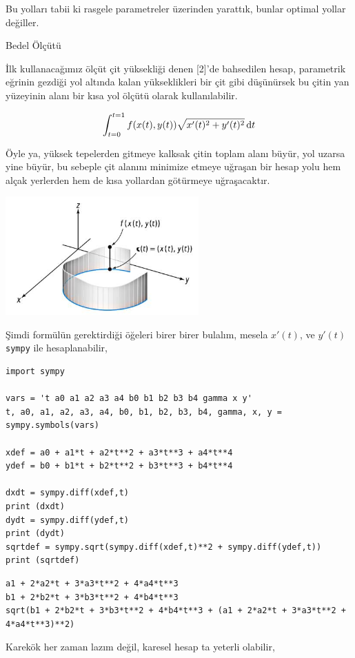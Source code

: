 \documentclass[12pt,fleqn]{article}\usepackage{../../common}
\begin{document}
Bu yolları tabii ki rasgele parametreler üzerinden yarattık, bunlar optimal
yollar değiller.

Bedel Ölçütü

İlk kullanacağımız ölçüt çit yüksekliği denen [2]'de bahsedilen hesap,
parametrik eğrinin gezdiği yol altında kalan yükseklikleri bir çit gibi
düşünürsek bu çitin yan yüzeyinin alanı bir kısa yol ölçütü olarak
kullanılabilir. 

$$
\int_{t=0}^{t=1} f(x(t),y(t)) \sqrt {x'(t)^2 + y'(t)^2} \,\mathrm{d} t
$$

Öyle ya, yüksek tepelerden gitmeye kalksak çitin toplam alanı büyür, yol uzarsa
yine büyür, bu sebeple çit alanını minimize etmeye uğraşan bir hesap yolu hem
alçak yerlerden hem de kısa yollardan götürmeye uğraşacaktır.

\includegraphics[width=20em]{../../calc_multi/calc_multi_06/calc_multi_06_04.jpg}

Şimdi formülün gerektirdiği öğeleri birer birer bulalım, mesela $x'(t)$, ve
$y'(t)$ \verb!sympy! ile hesaplanabilir,

\begin{verbatim}
import sympy

vars = 't a0 a1 a2 a3 a4 b0 b1 b2 b3 b4 gamma x y'
t, a0, a1, a2, a3, a4, b0, b1, b2, b3, b4, gamma, x, y = sympy.symbols(vars)

xdef = a0 + a1*t + a2*t**2 + a3*t**3 + a4*t**4
ydef = b0 + b1*t + b2*t**2 + b3*t**3 + b4*t**4

dxdt = sympy.diff(xdef,t)
print (dxdt)
dydt = sympy.diff(ydef,t)
print (dydt)
sqrtdef = sympy.sqrt(sympy.diff(xdef,t)**2 + sympy.diff(ydef,t))
print (sqrtdef)
\end{verbatim}

\begin{verbatim}
a1 + 2*a2*t + 3*a3*t**2 + 4*a4*t**3
b1 + 2*b2*t + 3*b3*t**2 + 4*b4*t**3
sqrt(b1 + 2*b2*t + 3*b3*t**2 + 4*b4*t**3 + (a1 + 2*a2*t + 3*a3*t**2 + 4*a4*t**3)**2)
\end{verbatim}

Karekök her zaman lazım değil, karesel hesap ta yeterli olabilir,
\end{document}
